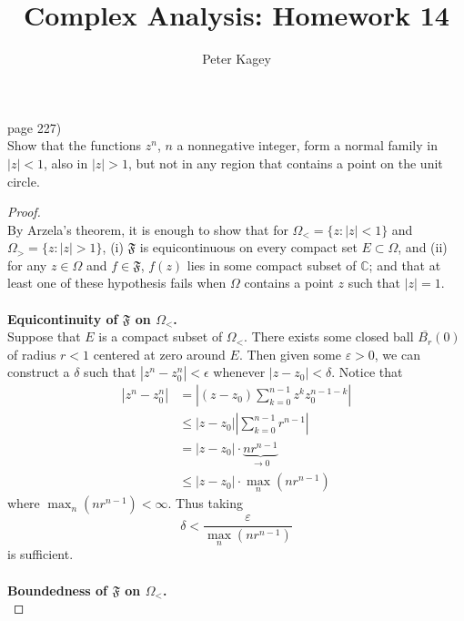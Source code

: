 \documentclass{article}
\newenvironment{problem}[2][Problem]{\begin{trivlist}
\item[\hskip \labelsep {\bfseries #1}\hskip \labelsep {\bfseries #2.}]}{\end{trivlist}}
\begin{document}
\title{Complex Analysis: Homework 14}
\author{Peter Kagey}

\maketitle

\begin{problem}{2} (page 227) \\
  Show that the functions $z^n$, $n$ a nonnegative integer, form a normal family
  in $|z| < 1$, also in $|z| > 1$, but not in any region that contains a point
  on the unit circle.
\end{problem}
\begin{proof} \text{} \\
  By Arzela's theorem, it is enough to show that for $\Omega_< = \{z : |z| < 1\}$
  and $\Omega_> = \{ z : |z| > 1 \}$,
  (i) $\mathfrak{F}$ is
  equicontinuous on every compact set $E \subset \Omega$, and (ii) for any
  $z \in \Omega$ and $f \in \mathfrak{F}$, $f(z)$ lies in some compact subset
  of $\mathbb{C}$; and that at least one of these hypothesis fails when $\Omega$
  contains a point $z$ such that $|z| = 1$.
  \\~\\
  \textbf{Equicontinuity of $\mathfrak{F}$ on $\Omega_<$.}\\
  Suppose that $E$ is a compact subset of $\Omega_<$.
  There exists some closed ball $\overline{B_r}(0)$ of radius $r < 1$ centered at
  zero around $E$. Then given some $\varepsilon > 0$, we can construct a
  $\delta$ such that $|z^n - z_0^n| < \epsilon$ whenever $|z - z_0| < \delta$.
  Notice that \begin{align*}
    |z^n - z_0^n| &= \left|(z - z_0)\sum_{k=0}^{n-1}z^k z_0^{n-1-k}\right| \\
    &\leq |z - z_0|\left|\sum_{k=0}^{n-1}r^{n-1}\right| \\
    &= |z - z_0|\cdot \underbrace{nr^{n-1}}_{\rightarrow 0}\\
    &\leq |z - z_0|\cdot \max_n \left(nr^{n-1}\right)
  \end{align*} where $\max_n \left(nr^{n-1}\right) < \infty$. Thus taking \[
    \delta < \frac{\varepsilon}{\displaystyle \max_n \left(nr^{n-1}\right)}
  \] is sufficient.
  \\~\\
  \textbf{Boundedness of $\mathfrak{F}$ on $\Omega_<$.}\\

\end{proof}
\end{document}
